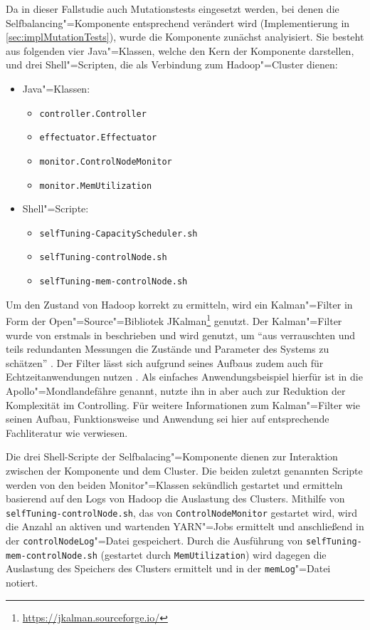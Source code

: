 Da in dieser Fallstudie auch Mutationstests eingesetzt werden, bei denen die Selfbalancing"=Komponente entsprechend verändert wird (Implementierung in \cref{sec:implMutationTests}), wurde die Komponente zunächst analyisiert.
Sie besteht aus folgenden vier Java"=Klassen, welche den Kern der Komponente darstellen, und drei Shell"=Scripten, die als Verbindung zum Hadoop"=Cluster dienen:

\begin{itemize}
    \item Java"=Klassen:
    \begin{itemize}
        \item \texttt{controller.Controller}
        \item \texttt{effectuator.Effectuator}
        \item \texttt{monitor.ControlNodeMonitor}
        \item \texttt{monitor.MemUtilization}
    \end{itemize}
    \item Shell"=Scripte:
    \begin{itemize}
        \item \texttt{selfTuning-CapacityScheduler.sh}
        \item \texttt{selfTuning-controlNode.sh}
        \item \texttt{selfTuning-mem-controlNode.sh}
    \end{itemize}
\end{itemize}

Um den Zustand von Hadoop korrekt zu ermitteln, wird ein Kalman"=Filter in Form der Open"=Source"=Bibliotek JKalman\footnote{\url{https://jkalman.sourceforge.io/}} genutzt.
Der Kalman"=Filter wurde von \citeauthor{Kalman1960} erstmals in \cite{Kalman1960} beschrieben und wird genutzt, um \enquote{aus verrauschten und teils redundanten Messungen die Zustände und Parameter des Systems zu schätzen} \cite{Marchthaler2017}.
Der Filter lässt sich aufgrund seines Aufbaus zudem auch für Echtzeitanwendungen nutzen \cite{Marchthaler2017}.
Als einfaches Anwendungsbeispiel hierfür ist in \cite{Marchthaler2017} die Apollo"=Mondlandefähre genannt, \citeauthor{Strukov2001} nutzte ihn in \cite{Strukov2001} aber auch zur Reduktion der Komplexität im Controlling.
Für weitere Informationen zum Kalman"=Filter wie seinen Aufbau, Funktionsweise und Anwendung sei hier auf entsprechende Fachliteratur wie \zB \cite{Kim2016,Simon2006,Aggoun2004} verwiesen.

Die drei Shell-Scripte der Selfbalacing"=Komponente dienen zur Interaktion zwischen der Komponente und dem Cluster.
Die beiden zuletzt genannten Scripte werden von den beiden Monitor"=Klassen sekündlich gestartet und ermitteln basierend auf den Logs von Hadoop die Auslastung des Clusters.
Mithilfe von \texttt{selfTuning-controlNode.sh}, das von \texttt{ControlNodeMonitor} gestartet wird, wird die Anzahl an aktiven und wartenden YARN"=Jobs ermittelt und anschließend in der \texttt{controlNodeLog}"=Datei gespeichert.
Durch die Ausführung von \texttt{selfTuning-mem-controlNode.sh} (gestartet durch \texttt{MemUtilization}) wird dagegen die Auslastung des Speichers des Clusters ermittelt und in der \texttt{memLog}"=Datei notiert.

